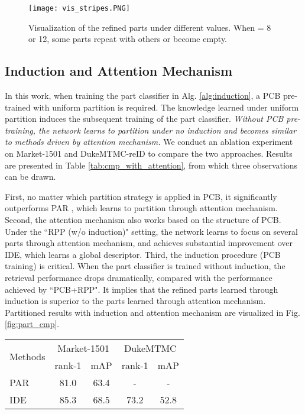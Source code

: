 \documentclass[10pt,twocolumn,letterpaper]{article}
\begin{document}
{{{\begin{figure}[t]
\begin{center}
\texttt{[image: vis\_stripes.PNG]}
\end{center}
   \caption{Visualization of the refined parts under different  values. When  = 8 or 12, some parts repeat with others or become empty.}
\label{fig:vis_stripes}
\end{figure}




\subsection{Induction and Attention Mechanism}\label{sec:cmp_attention}
In this work, when training the part classifier in Alg. \ref{alg:induction}, a PCB pre-trained with uniform partition is required. The knowledge learned under uniform partition induces the subsequent training of the part classifier. \emph{Without PCB pre-training, the network learns to partition \bm{} under no induction and becomes similar to methods driven by attention mechanism.} We conduct an ablation experiment on Market-1501 and DukeMTMC-reID to compare the two approaches. Results are presented in Table \ref{tab:cmp_with_attention}, from which three observations can be drawn.

First, no matter which partition strategy is applied in PCB, it significantly outperforms PAR \cite{Zhao2017Deeply}, which learns to partition through attention mechanism. Second, the attention mechanism also works based on the structure of PCB. Under the ``RPP (w/o induction)" setting, the network learns to focus on several parts through attention mechanism, and achieves substantial improvement over IDE, which learns a global descriptor. Third, the induction procedure (PCB training) is critical. When the part classifier is trained without induction, the retrieval performance drops dramatically, compared with the performance achieved by ``PCB+RPP". It implies that the refined parts learned through induction is superior to the parts learned through attention mechanism.
Partitioned results with induction and attention mechanism are visualized in Fig. \ref{fig:part_cmp}.
\setlength{\tabcolsep}{2.9pt}
\begin{table}
\begin{center}
\begin{tabular}{l|cc|cc}
\hline
\multicolumn{1}{l|}{\multirow{2}{*}{Methods}}&\multicolumn{2}{c|}{Market-1501}&\multicolumn{2}{c}{DukeMTMC}\\
\cline{2-5}
\multicolumn{1}{c|}{}&rank-1&mAP&rank-1&mAP\\
\hline
PAR\cite{Zhao2017Deeply}   &81.0&63.4   &-&-\\
IDE   &85.3 & 68.5   & 73.2 &52.8\\


\end{tabular}
\end{center}
\end{table}}}}
\end{document}
